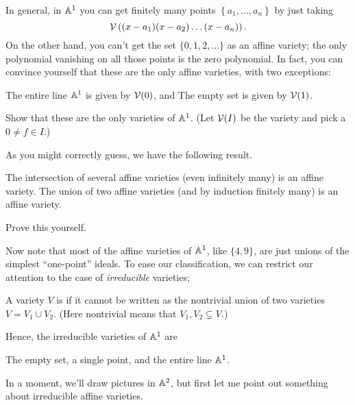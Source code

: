 In general, in $\mathbb A^1$ you can get finitely many points $\left\{ a_1, \dots, a_n \right\}$ by
just taking \[ \mathcal V\left( (x-a_1)(x-a_2)\dots(x-a_n) \right). \]
On the other hand, you can't get the set $\{0,1,2,\dots\}$ as an affine variety; the only polynomial vanishing
on all those points is the zero polynomial.
In fact, you can convince yourself that these are the only affine varieties, with two exceptions:
\begin{itemize}
	\ii The entire line $\mathbb A^1$ is given by $\mathcal V(0)$, and
	\ii The empty set is given by $\mathcal V(1)$.
\end{itemize}
\begin{ques}
	Show that these are the only varieties of $\mathbb A^1$.
	(Let $\mathcal V(I)$ be the variety and pick a $0 \neq f \in I$.)
\end{ques}

As you might correctly guess, we have the following result.
\begin{theorem}
	\listhack
	\begin{enumerate}[(a)]
		\ii The intersection of several affine varieties (even infinitely many) is an affine variety.
		\ii The union of two affine varieties (and by induction finitely many) is an affine variety.
	\end{enumerate}
\end{theorem}
\begin{exercise}
	Prove this yourself.
\end{exercise}

Now note that most of the affine varieties of $\mathbb A^1$, like $\{4,9\}$,
are just unions of the simplest ``one-point'' ideals.
To ease our classification,
we can restrict our attention to the case of \emph{irreducible} varieties;
\begin{definition}
	A variety $V$ is  if it cannot be written
	as the nontrivial union of two varieties $V = V_1 \cup V_2$.
	(Here nontrivial means that $V_1, V_2 \subsetneq V$.)
\end{definition}

Hence, the irreducible varieties of $\mathbb A^1$ are
\begin{enumerate}[(i)]
	\ii The empty set,
	\ii a single point, and
	\ii the entire line $\mathbb A^1$.
\end{enumerate}

In a moment, we'll draw pictures in $\mathbb A^2$,
but first let me point out something about irreducible affine varieties.

